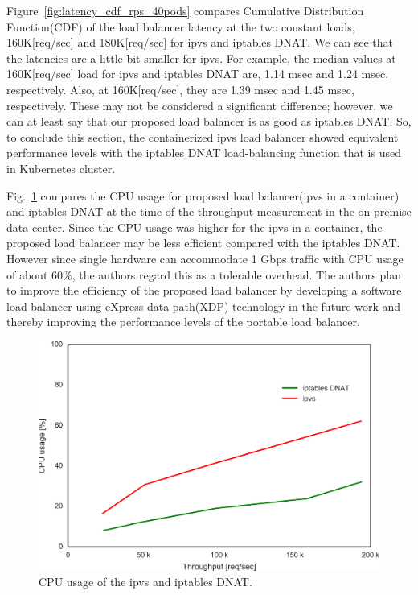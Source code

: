 Figure~\ref{fig:latency_cdf_rps_40pods} compares Cumulative Distribution Function(CDF) of the load balancer latency at the two constant loads, 160K[req/sec] and 180K[req/sec] for ipvs and iptables DNAT.
We can see that the latencies are a little bit smaller for ipvs.
For example, the median values at 160K[req/sec] load for ipvs and iptables DNAT are, 1.14 msec and 1.24 msec, respectively.
Also, at 160K[req/sec], they are 1.39 msec and 1.45 msec, respectively.
These may not be considered a significant difference; however, we can at least say that our proposed load balancer is as good as iptables DNAT.
So, to conclude this section, the containerized ipvs load balancer showed equivalent performance levels with the iptables DNAT load-balancing function that is used in Kubernetes cluster.


Fig.~\ref{fig:cpu_usage} compares the CPU usage for proposed load balancer(ipvs in a container) and iptables DNAT at the time of the throughput measurement in the on-premise data center.
Since the CPU usage was higher for the ipvs in a container, the proposed load balancer may be less efficient compared with the iptables DNAT.
However since single hardware can accommodate 1 Gbps traffic with CPU usage of about 60\%, the authors regard this as a tolerable overhead.
The authors plan to improve the efficiency of the proposed load balancer by developing a software load balancer using eXpress data path(XDP) technology\cite{hoiland2018express} in the future work and thereby improving the performance levels of the portable load balancer.

\begin{figure}[h]
  \centering
  \includegraphics[width=0.8\columnwidth]{Figs/cpu_usage}
  \caption{CPU usage of the ipvs and iptables DNAT.}
  \label{fig:cpu_usage}
\end{figure}


